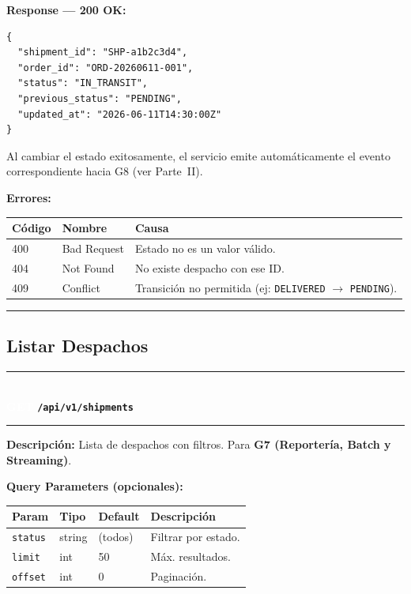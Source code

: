 \documentclass[11pt, a4paper]{article}
\newcommand{\httpmethod}[2]{%
  \colorbox{#1}{\textcolor{white}{\textbf{\small\textsf{#2}}}}%
}
\newcommand{\routeheader}[3]{%
  \noindent\rule{\textwidth}{1.5pt}\\[0.3em]
  \httpmethod{#1}{#2}\;\texttt{\bfseries #3}\\[0.3em]
  \rule{\textwidth}{0.4pt}
  \vspace{0.3cm}
}
\begin{document}
\textbf{Response --- 200 OK:}

\begin{lstlisting}
{
  "shipment_id": "SHP-a1b2c3d4",
  "order_id": "ORD-20260611-001",
  "status": "IN_TRANSIT",
  "previous_status": "PENDING",
  "updated_at": "2026-06-11T14:30:00Z"
}
\end{lstlisting}

\begin{infobox}
  Al cambiar el estado exitosamente, el servicio emite automáticamente
  el evento correspondiente hacia G8 (ver Parte~II).
\end{infobox}

\textbf{Errores:}
\begin{table}[h!]
\small
\begin{tabularx}{\textwidth}{l l X}
  \toprule
  \textbf{Código} & \textbf{Nombre} & \textbf{Causa} \\
  \midrule
  400 & Bad Request & Estado no es un valor válido. \\
  404 & Not Found   & No existe despacho con ese ID. \\
  409 & Conflict    & Transición no permitida (ej: \texttt{DELIVERED} $\rightarrow$ \texttt{PENDING}). \\
  \bottomrule
\end{tabularx}
\end{table}

\noindent\rule{\textwidth}{0.4pt}

\subsection{Listar Despachos}

\routeheader{get}{GET}{/api/v1/shipments}

\textbf{Descripción:} Lista de despachos con filtros. Para \textbf{G7 (Reportería, Batch y Streaming)}.

\vspace{0.3cm}
\textbf{Query Parameters (opcionales):}
\begin{table}[h!]
\small
\begin{tabularx}{\textwidth}{l l l X}
  \toprule
  \textbf{Param} & \textbf{Tipo} & \textbf{Default} & \textbf{Descripción} \\
  \midrule
  \texttt{status} & string & (todos) & Filtrar por estado. \\
  \texttt{limit}  & int    & 50      & Máx. resultados. \\
  \texttt{offset} & int    & 0       & Paginación. \\
  \bottomrule
\end{tabularx}
\end{table}
\end{document}
